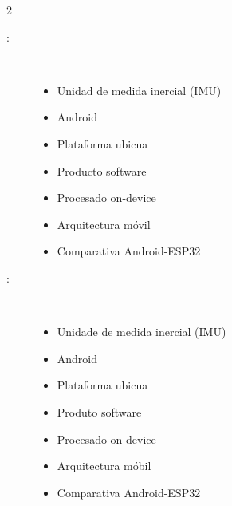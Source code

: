 \begin{multicols}{2}
\begin{description}
\item [\palabraschaveprincipal:] \mbox{} \\[-20pt]
  \begin{itemize}
    \item Unidad de medida inercial (IMU)
    \item Android
    \item Plataforma ubicua
    \item Producto software
    \item Procesado on-device
    \item Arquitectura móvil
    \item Comparativa Android-ESP32
  \end{itemize}
\end{description}
\begin{description}
\item [\palabraschavesecundaria:] \mbox{} \\[-20pt]
  \begin{itemize}
    \item Unidade de medida inercial (IMU)
    \item Android
    \item Plataforma ubicua
    \item Produto software
    \item Procesado on-device
    \item Arquitectura móbil
    \item Comparativa Android-ESP32
  \end{itemize}
\end{description}
\end{multicols}
